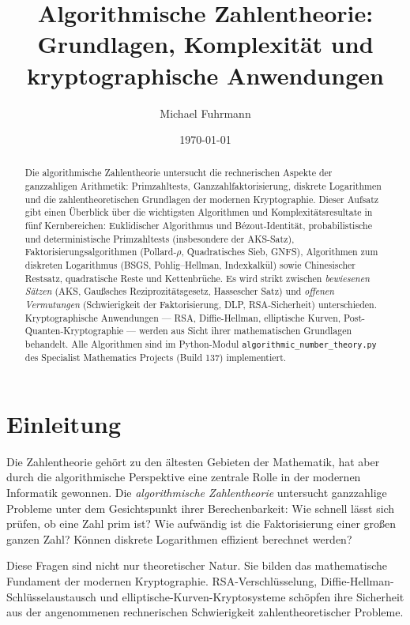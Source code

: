 \documentclass[12pt,a4paper]{amsart}
\author{Michael Fuhrmann}
\date{\today}
\title{Algorithmische Zahlentheorie:\\
Grundlagen, Komplexit\"at und kryptographische Anwendungen}
\theoremstyle{definition}
\begin{document}
\begin{abstract}
Die algorithmische Zahlentheorie untersucht die rechnerischen Aspekte der
ganzzahligen Arithmetik: Primzahltests, Ganzzahlfaktorisierung, diskrete
Logarithmen und die zahlentheoretischen Grundlagen der modernen Kryptographie.
Dieser Aufsatz gibt einen Überblick über die wichtigsten Algorithmen und
Komplexitätsresultate in fünf Kernbereichen: Euklidischer Algorithmus und
Bézout-Identität, probabilistische und deterministische Primzahltests
(insbesondere der AKS-Satz), Faktorisierungsalgorithmen (Pollard-$\rho$,
Quadratisches Sieb, GNFS), Algorithmen zum diskreten Logarithmus (BSGS,
Pohlig--Hellman, Indexkalkül) sowie Chinesischer Restsatz, quadratische Reste
und Kettenbrüche. Es wird strikt zwischen \emph{bewiesenen Sätzen} (AKS,
Gaußsches Reziprozitätsgesetz, Hassescher Satz) und \emph{offenen Vermutungen}
(Schwierigkeit der Faktorisierung, DLP, RSA-Sicherheit) unterschieden.
Kryptographische Anwendungen --- RSA, Diffie-Hellman, elliptische Kurven,
Post-Quanten-Kryptographie --- werden aus Sicht ihrer mathematischen Grundlagen
behandelt. Alle Algorithmen sind im Python-Modul
\texttt{algorithmic\_number\_theory.py} des Specialist Mathematics Projects
(Build 137) implementiert.
\end{abstract}

\maketitle
\tableofcontents

\section{Einleitung}

Die Zahlentheorie gehört zu den ältesten Gebieten der Mathematik, hat aber
durch die algorithmische Perspektive eine zentrale Rolle in der modernen
Informatik gewonnen. Die \emph{algorithmische Zahlentheorie} untersucht
ganzzahlige Probleme unter dem Gesichtspunkt ihrer Berechenbarkeit: Wie schnell
lässt sich prüfen, ob eine Zahl prim ist? Wie aufwändig ist die Faktorisierung
einer großen ganzen Zahl? Können diskrete Logarithmen effizient berechnet werden?

Diese Fragen sind nicht nur theoretischer Natur. Sie bilden das mathematische
Fundament der modernen Kryptographie. RSA-Verschlüsselung, Diffie-Hellman-
Schlüsselaustausch und elliptische-Kurven-Kryptosysteme schöpfen ihre Sicherheit
aus der angenommenen rechnerischen Schwierigkeit zahlentheoretischer Probleme.
\end{document}
